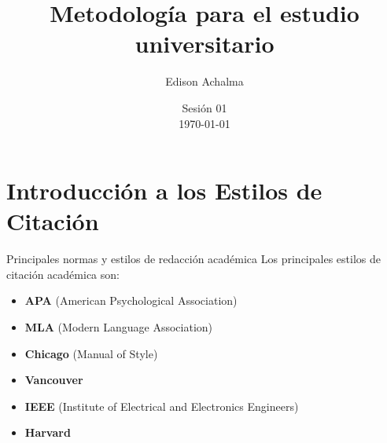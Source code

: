 \documentclass[
11pt, %
]{beamer}
\title[Metodología de Investigación]{Metodología para el estudio universitario} %
\author[Edison Achalma]{Edison Achalma} %
\institute[CAU - UNSCH]{Corporación Académica Universitaria CAU - UNSCH \\ \smallskip \textit{achalmed.18@gmail.com}} %
\date[\today]{Sesión 01 \\ \today} %
\begin{document}
\begin{frame}
	\titlepage
\end{frame}



\section{Introducción a los Estilos de Citación}

\begin{frame}{Principales normas y estilos de redacción académica}
	Los principales estilos de citación académica son:
	\begin{itemize}
		\item \textbf{APA} (American Psychological Association)
		\item \textbf{MLA} (Modern Language Association)
		\item \textbf{Chicago} (Manual of Style)
		\item \textbf{Vancouver}
		\item \textbf{IEEE} (Institute of Electrical and Electronics Engineers)
		\item \textbf{Harvard}
	\end{itemize}
\end{frame}
\end{document}
